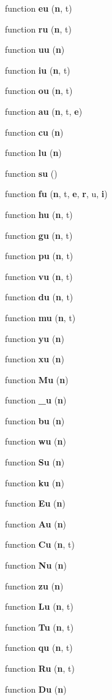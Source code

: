 \begin{DoxyCompactItemize}
function {\bf eu} ({\bf n}, t)
\item 
function {\bf ru} ({\bf n}, t)
\item 
function {\bf uu} ({\bf n})
\item 
function {\bf iu} ({\bf n}, t)
\item 
function {\bf ou} ({\bf n}, t)
\item 
function {\bf au} ({\bf n}, t, {\bf e})
\item 
function {\bf cu} ({\bf n})
\item 
function {\bf lu} ({\bf n})
\item 
function {\bf su} ()
\item 
function {\bf fu} ({\bf n}, t, {\bf e}, {\bf r}, u, {\bf i})
\item 
function {\bf hu} ({\bf n}, t)
\item 
function {\bf gu} ({\bf n}, t)
\item 
function {\bf pu} ({\bf n}, t)
\item 
function {\bf vu} ({\bf n}, t)
\item 
function {\bf du} ({\bf n}, t)
\item 
function {\bf mu} ({\bf n}, t)
\item 
function {\bf yu} ({\bf n})
\item 
function {\bf xu} ({\bf n})
\item 
function {\bf Mu} ({\bf n})
\item 
function {\bf \+\_\+u} ({\bf n})
\item 
function {\bf bu} ({\bf n})
\item 
function {\bf wu} ({\bf n})
\item 
function {\bf Su} ({\bf n})
\item 
function {\bf ku} ({\bf n})
\item 
function {\bf Eu} ({\bf n})
\item 
function {\bf Au} ({\bf n})
\item 
function {\bf Cu} ({\bf n}, t)
\item 
function {\bf Nu} ({\bf n})
\item 
function {\bf zu} ({\bf n})
\item 
function {\bf Lu} ({\bf n}, t)
\item 
function {\bf Tu} ({\bf n}, t)
\item 
function {\bf qu} ({\bf n}, t)
\item 
function {\bf Ru} ({\bf n}, t)
\item 
function {\bf Du} ({\bf n})
\item 

\end{DoxyCompactItemize}
